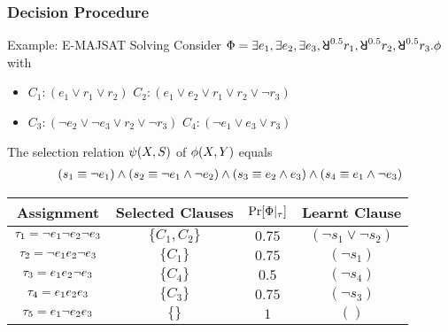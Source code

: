 \begin{frame}
    \frametitle{Decision Procedure}
    \begin{block}{Example: E-MAJSAT Solving}
        Consider $\Qf=\exists e_1,\exists e_2,\exists e_3,\random{0.5} r_1,\random{0.5} r_2,\random{0.5} r_3.\pf$ with
        \begin{itemize}
            \item[] $C_1: (e_1 \lor r_1 \lor r_2)$ $C_2: (e_1 \lor e_2 \lor r_1 \lor r_2 \lor \lnot r_3)$
            \item[] $C_3: (\lnot e_2 \lor \lnot e_3 \lor r_2 \lor \lnot r_3)$ $C_4: (\lnot e_1 \lor e_3 \lor r_3)$
        \end{itemize}
        \pause
        The selection relation $\psi(X,S)$ of $\phi(X,Y)$ equals
        \abovedisplayskip=0pt
        \belowdisplayskip=0pt
        \begin{align*}
            (s_{1} \equiv \lnot e_1) \land
            (s_{2} \equiv \lnot e_1 \land \lnot e_2) \land
            (s_{3} \equiv e_2 \land e_3) \land
            (s_{4} \equiv e_1 \land \lnot e_3)
        \end{align*}
        \pause
        \begin{table}[t]
            \centering
            \small
            \begin{tabular}{c|c|c|c}
                Assignment                            & Selected Clauses & $\Pr[\Phi|_{\tau}]$ & Learnt Clause                \\
                \hline
                $\tau_1=\lnot e_1 \lnot e_2 \lnot e_3$ & $\{C_1,C_2\}$    & $0.75$                 & $(\lnot s_1 \lor \lnot s_2)$ \\
                \pause
                $\tau_2=\lnot e_1 e_2 \lnot e_3$       & $\{C_1\}$        & $0.75$                 & $(\lnot s_1)$                \\
                \pause
                $\tau_3=e_1 e_2 \lnot e_3$             & $\{C_4\}$        & $0.5$                  & $(\lnot s_4)$                \\
                \pause
                $\tau_4=e_1 e_2 e_3$                   & $\{C_3\}$        & $0.75$                 & $(\lnot s_3)$                \\
                \pause
                \alert<8>{$\tau_5=e_1 \lnot e_2 e_3$}  & $\{\}$           & $1$                    & $()$
            \end{tabular}
        \end{table}
    \end{block}
\end{frame}


